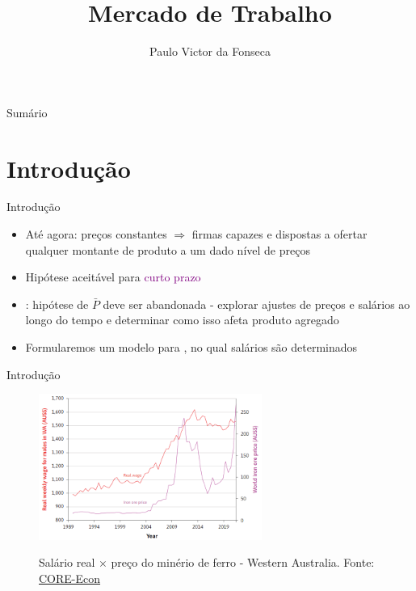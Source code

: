 \documentclass[10pt]{beamer}
\title[]{Mercado de Trabalho}
\author[]{Paulo Victor da Fonseca}
\date{}
\begin{document}
\begin{frame}[plain]
\end{frame}

\begin{frame}{Sumário}
    \tableofcontents
\end{frame}

\section{Introdução}
\begin{frame}
    {Introdução}
    \begin{itemize}
        \item Até agora: preços constantes $\Rightarrow$ firmas capazes e dispostas a ofertar qualquer montante de produto a um dado nível de preços\bigskip
        \item Hipótese aceitável para \textcolor{purple}{curto prazo}\bigskip
        \item {}: hipótese de $\bar{P}$ deve ser abandonada - explorar ajustes de preços e salários ao longo do tempo e determinar como isso afeta produto agregado\bigskip
        \item Formularemos um modelo para , no qual salários são determinados
    \end{itemize}
\end{frame}

\begin{frame}
    {Introdução}
    \begin{figure}
        \centering
        \href{https://www.core-econ.org/the-economy/book/text/09.html}{\includegraphics[width=0.65\textwidth]{./figures/aula10_fig1.PNG}}
        \caption{Salário real $\times$ preço do minério de ferro - Western Australia. Fonte: \href{https://www.core-econ.org/the-economy/book/text/09.html}{CORE-Econ}}
    \end{figure}
\end{frame}
\end{document}
